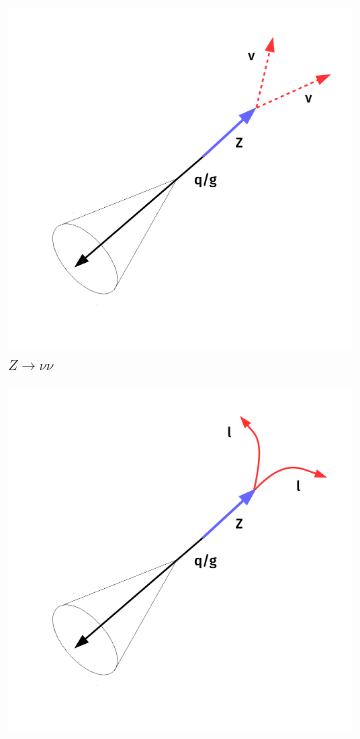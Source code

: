 \begin{figure}[!ht]
    \begin{center}
        \begin{subfigure}[t]{0.49\textwidth}
            \includegraphics[width=\textwidth]{figures/monotop/diagrams/zsr.pdf}
            \caption{$Z\rightarrow\nu\nu$}
        \end{subfigure}
        \begin{subfigure}[t]{0.49\textwidth}
            \includegraphics[width=\textwidth]{figures/monotop/diagrams/zcr.pdf}

\end{subfigure}
\end{center}
\end{figure}
